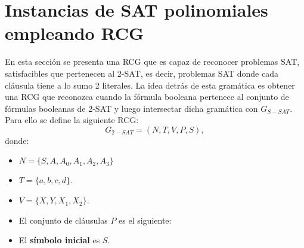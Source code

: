 \documentclass[12pt]{article}
\begin{document}
\section{Instancias de SAT polinomiales empleando RCG}

En esta sección se presenta una RCG que es capaz de reconocer problemas SAT, satisfacibles que pertenecen
al 2-SAT, es decir, problemas SAT donde cada cláusula tiene a lo sumo 2 literales. La idea detrás de esta
gramática es obtener una RCG que reconozca cuando la fórmula booleana pertenece al conjunto
de fórmulas booleanas de 2-SAT y luego intersectar dicha gramática con $G_{S-SAT}$.  Para ello se define la siguiente RCG:
\[
    G_{2-SAT} = (N, T, V, P, S),
\]
donde:

\begin{itemize}
    \item $N=\{S,A,A_0,A_1,A_2,A_3\}$
    \item $T=\{a,b,c,d\}$.
    \item $V=\{X,Y,X_1,X_2\}$.
    \item El conjunto de cláusulas $P$ es el siguiente:
          \begin{enumerate}
          \end{enumerate}
    \item El \textbf{símbolo inicial} es $S$.
\end{itemize}
\end{document}
